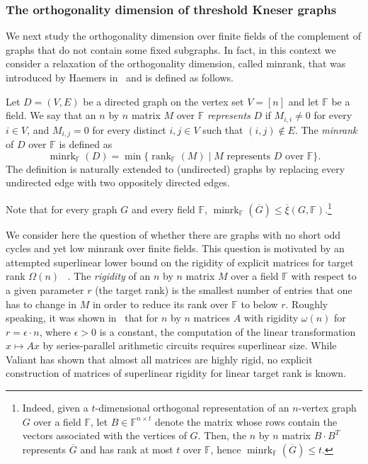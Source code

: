 \documentclass{toc}
\newcommand{\Fset}{\mathbb{F}}
\newcommand{\od}{\overline{\xi}}
\newcommand{\eps}{\epsilon}
\newcommand{\rank}{\mathop{\mathrm{rank}}}
\newcommand{\minrank}{\mathop{\mathrm{minrk}}}
\begin{document}
%
\subsubsection{The orthogonality dimension of threshold Kneser graphs}
%

We next
%
%
study
the orthogonality dimension over finite fields of the complement of graphs that do not contain some fixed subgraphs.
In fact, in this context we consider %
%
a relaxation %
of the orthogonality dimension,
%
%
%
%
called minrank, that was introduced by Haemers in~\cite{Haemers79, Haemers81} and is defined as follows.

\begin{definition}[Minrank]\label{def:minrank}
Let $D=(V,E)$ be a directed graph on the vertex set $V=[n]$ and let $\Fset$ be a field.
We say that an $n$ by $n$ matrix $M$ over $\Fset$ \emph{represents} $D$ if $M_{i,i} \neq 0$ for every $i \in V$, and $M_{i,j}=0$ for every distinct $i,j \in V$ such that $(i,j) \notin E$.
The \emph{minrank} of $D$ over $\Fset$ is defined as
\[{\minrank}_{\Fset}(D) =  \min\{{\rank}_{\Fset}(M)\mid M \mbox{ represents }D\mbox{ over }\Fset\}.\]
The definition is naturally extended to (undirected) graphs by replacing every undirected edge with two oppositely directed edges.
\end{definition}
\noindent
Note that for every graph $G$ and every field $\Fset$, ${\minrank}_{\Fset}(\overline{G}) \leq \od(G,\Fset)$.\footnote{Indeed, given a $t$-dimensional orthogonal representation of an $n$-vertex graph $G$ over a field $\Fset$,
%
%
let $B \in \Fset^{n \times t}$ denote the matrix
whose rows contain the vectors associated with the vertices of $G$. Then, the $n$ by $n$ matrix $B \cdot B^T$ represents $\overline{G}$ and has rank at most $t$ over $\Fset$, hence ${\minrank}_{\Fset}(\overline{G}) \leq t$.}

%
%

We consider here the question of whether there are graphs with no short odd cycles and yet low minrank over finite fields.
%
%
This question is motivated by an attempted superlinear lower bound on the rigidity of explicit matrices
for target rank $\Omega(n)$%
%
%
~\cite{CodenottiPR00}. The \emph{rigidity} of an $n$ by $n$ matrix $M$ over a field $\Fset$ with respect to a given parameter $r$
(the target rank)  %
%
is the smallest number of entries that one has to change in $M$ in order to reduce its rank over $\Fset$ to below $r$.
%
Roughly speaking, it was shown in~\cite{Valiant77,C08} that
%
%
%
for $n$ by $n$ matrices $A$ with rigidity $\omega(n)$
for $r = \eps \cdot n$, where $\eps> 0$ is a constant,
the computation of the linear transformation $x\mapsto Ax$
%
%
%
%
by series-parallel arithmetic circuits requires superlinear size.
While Valiant has shown that almost all matrices are highly rigid,
%
%
no explicit construction of matrices
%
%
of superlinear rigidity for linear target rank is known.  %
\end{document}
